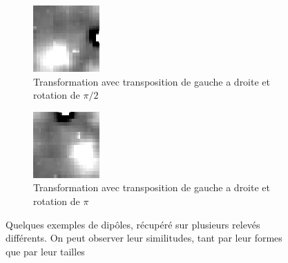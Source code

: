 \documentclass[a4paper, 12pt, titlepage, oneside, french]{article}
\begin{document}
\begin{figure}[H]
		\begin{subfigure}[t]{0.3\linewidth}
			\includegraphics[width=\linewidth]{ExempleF90.png}
			\caption{Transformation avec transposition de gauche a droite et rotation de $\pi/2$  }
		\end{subfigure}
		\begin{subfigure}[t]{0.3\linewidth}
			\includegraphics[width=\linewidth]{ExempleF180.png}
			\caption{Transformation avec transposition de gauche a droite et rotation de $\pi$}
		\end{subfigure}
				\caption{Quelques exemples de dipôles, récupéré sur plusieurs relevés différents. On peut observer leur similitudes, tant par leur formes que par leur tailles}
		\label{fig:DipoleExample}
	\end{figure}
\end{document}
